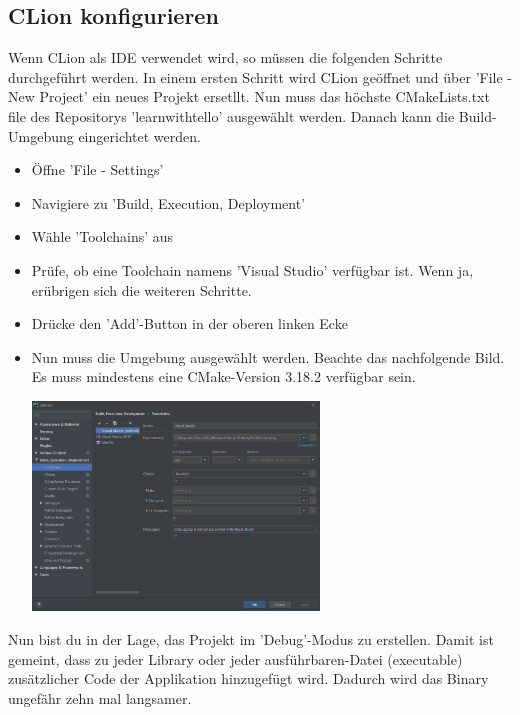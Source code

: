 \subsection{CLion konfigurieren}
Wenn CLion als IDE verwendet wird, so müssen die folgenden Schritte durchgeführt werden.
In einem ersten Schritt wird CLion geöffnet und über 'File - New Project' ein neues Projekt ersetllt.
Nun muss das höchste CMakeLists.txt file des Repositorys 'learn\textunderscore with\textunderscore tello' ausgewählt werden.
Danach kann die Build-Umgebung eingerichtet werden.

\begin{itemize}
    \item Öffne 'File - Settings'
    \item Navigiere zu 'Build, Execution, Deployment'
    \item Wähle 'Toolchains' aus
    \item Prüfe, ob eine Toolchain namens 'Visual Studio' verfügbar ist.
    Wenn ja, erübrigen sich die weiteren Schritte.
    \item Drücke den 'Add'-Button in der oberen linken Ecke
    \item Nun muss die Umgebung ausgewählt werden. Beachte das nachfolgende Bild.
    Es muss mindestens eine CMake-Version 3.18.2 verfügbar sein.\par
    \begin{minipage}{\linewidth}
        \centering
        \includegraphics[width=0.6\textwidth]{../common/chapter_01/resources/01_clion_configure_toolchain.png}
    \end{minipage}
\end{itemize}
Nun bist du in der Lage, das Projekt im 'Debug'-Modus zu erstellen. Damit ist gemeint, dass zu jeder Library oder jeder
ausführbaren-Datei (executable) zusätzlicher Code der Applikation hinzugefügt wird. Dadurch wird das Binary ungefähr zehn mal langsamer.
